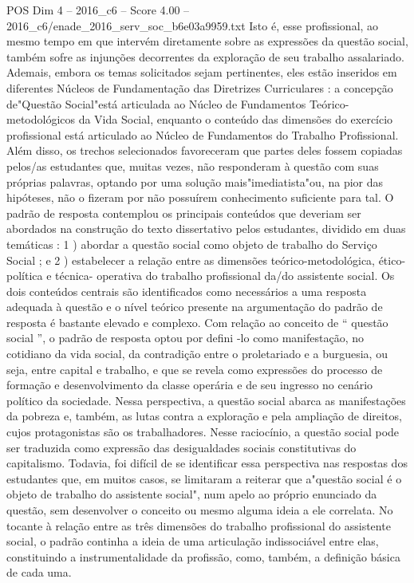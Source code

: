 \begin{textsample}{POS Dim 4 – 2016\_c6 – Score 4.00 – 2016\_c6/enade\_2016\_serv\_soc\_b6e03a9959.txt}
Isto é, esse profissional, ao mesmo tempo em que intervém diretamente sobre as expressões da questão social, também sofre as injunções decorrentes da exploração de seu trabalho assalariado.
Ademais, embora os temas solicitados sejam pertinentes, eles estão inseridos em diferentes Núcleos de Fundamentação das Diretrizes Curriculares : a concepção de"Questão Social"está articulada ao Núcleo de Fundamentos Teórico-metodológicos da Vida Social, enquanto o conteúdo das dimensões do exercício profissional está articulado ao Núcleo de Fundamentos do Trabalho Profissional.
Além disso, os trechos selecionados favoreceram que partes deles fossem copiadas pelos/as estudantes que, muitas vezes, não responderam à questão com suas próprias palavras, optando por uma solução mais"imediatista"ou, na pior das hipóteses, não o fizeram por não possuírem conhecimento suficiente para tal.
O padrão de resposta contemplou os principais conteúdos que deveriam ser abordados na construção do texto dissertativo pelos estudantes, dividido em duas temáticas : 1 ) abordar a questão social como objeto de trabalho do Serviço Social ; e 2 ) estabelecer a relação entre as dimensões teórico-metodológica, ético-política e técnica- operativa do trabalho profissional da/do assistente social.
Os dois conteúdos centrais são identificados como necessários a uma resposta adequada à questão e o nível teórico presente na argumentação do padrão de resposta é bastante elevado e complexo.
Com relação ao conceito de “ questão social ”, o padrão de resposta optou por defini -lo como manifestação, no cotidiano da vida social, da contradição entre o proletariado e a burguesia, ou seja, entre capital e trabalho, e que se revela como expressões do processo de formação e desenvolvimento da classe operária e de seu ingresso no cenário político da sociedade.
Nessa perspectiva, a questão social abarca as manifestações da pobreza e, também, as lutas contra a exploração e pela ampliação de direitos, cujos protagonistas são os trabalhadores.
Nesse raciocínio, a questão social pode ser traduzida como expressão das desigualdades sociais constitutivas do capitalismo.
Todavia, foi difícil de se identificar essa perspectiva nas respostas dos estudantes que, em muitos casos, se limitaram a reiterar que a"questão social é o objeto de trabalho do assistente social", num apelo ao próprio enunciado da questão, sem desenvolver o conceito ou mesmo alguma ideia a ele correlata.
No tocante à relação entre as três dimensões do trabalho profissional do assistente social, o padrão continha a ideia de uma articulação indissociável entre elas, constituindo a instrumentalidade da profissão, como, também, a definição básica de cada uma.

\end{textsample}
